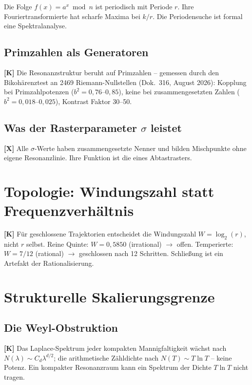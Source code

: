Die Folge $f(x)=a^x \bmod n$ ist periodisch mit Periode $r$. Ihre
Fouriertransformierte hat scharfe Maxima bei $k/r$. Die Periodensuche
ist formal eine Spektralanalyse.

\subsection{Primzahlen als Generatoren}

\textbf{[K]} Die Resonanzstruktur beruht auf Primzahlen -- gemessen
durch den Bikohärenztest an 2469 Riemann-Nullstellen (Dok.~316,
August 2026): Kopplung bei Primzahlpotenzen ($b^2 = 0{,}76$--$0{,}85$),
keine bei zusammengesetzten Zahlen ($b^2 = 0{,}018$--$0{,}025$),
Kontrast Faktor 30--50.

\subsection{Was der Rasterparameter $\sigma$ leistet}

\textbf{[X]} Alle $\sigma$-Werte haben zusammengesetzte Nenner und
bilden Mischpunkte ohne eigene Resonanzlinie. Ihre Funktion ist die
eines Abtastrasters.

\section{Topologie: Windungszahl statt Frequenzverhältnis}

\textbf{[K]} Für geschlossene Trajektorien entscheidet die Windungszahl
$W = \log_2(r)$, nicht $r$ selbst. Reine Quinte: $W = 0{,}5850$
(irrational) $\to$ offen. Temperierte: $W = 7/12$ (rational)
$\to$ geschlossen nach 12 Schritten. Schließung ist ein Artefakt der
Rationalisierung.

\section{Strukturelle Skalierungsgrenze}

\subsection{Die Weyl-Obstruktion}

\textbf{[K]} Das Laplace-Spektrum jeder kompakten Mannigfaltigkeit
wächst nach $N(\lambda) \sim C_d\lambda^{d/2}$; die arithmetische
Zähldichte nach $N(T) \sim T\ln T$ -- keine Potenz. Ein kompakter
Resonanzraum kann ein Spektrum der Dichte $T\ln T$ nicht tragen.


